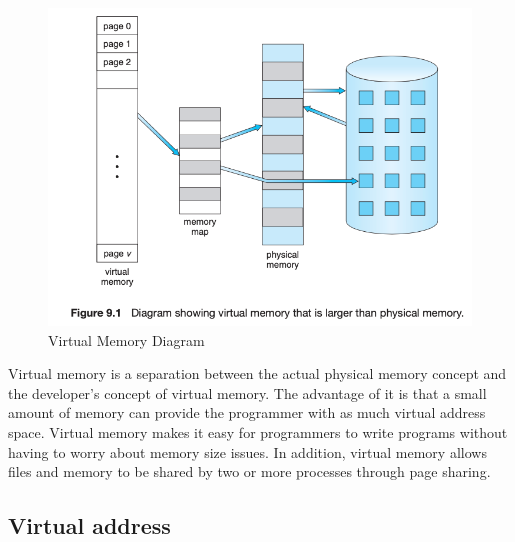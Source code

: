 \documentclass{homework}
\begin{document}
\begin{figure}[h]
\begin{center}
\includegraphics[scale=0.7]{31.png}    
\caption{Virtual Memory Diagram}
\end{center}
\end{figure}

Virtual memory is a separation between the actual physical memory concept and the developer's concept of virtual memory. The advantage of it is that a small amount of memory can provide the programmer with as much virtual address space. Virtual memory makes it easy for programmers to write programs without having to worry about memory size issues. In addition, virtual memory allows files and memory to be shared by two or more processes through page sharing. 

\subsection{Virtual address}
\end{document}
